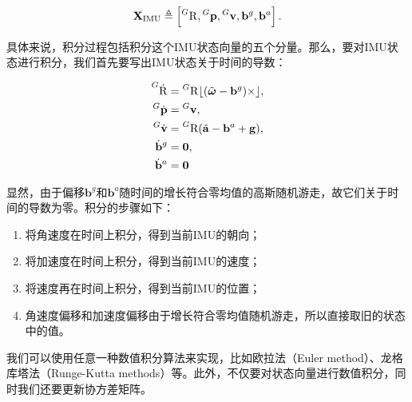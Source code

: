 \begin{equation}
  \mathbf{X}_{\textrm{IMU}} \triangleq
  \left[
      \prescript{G}{}{\mathrm R},
      \prescript{G}{}{\mathbf p},
      \prescript{G}{}{\mathbf v},
      \mathbf{b}^g, \mathbf{b}^a
  \right].
\end{equation}

具体来说，积分过程包括积分这个IMU状态向量的五个分量。那么，要对IMU状态进行积分，我们首先要写出IMU状态关于时间的导数：

\begin{equation}
\begin{aligned}
    \prescript{G}{}{\dot{\mathrm R}}
        &= \prescript{G}{}{\mathrm R} \lfloor(\tilde{\bm\omega} - \mathbf{b}^g)\times\rfloor, \\
    \prescript{G}{}{\dot{\mathbf p}}
        &= \prescript{G}{}{\mathbf v}, \\
    \prescript{G}{}{\dot{\mathbf v}}
        &= \prescript{G}{}{\mathrm R} (\tilde{\mathbf a} - \mathbf{b}^a + \mathbf{g}), \\
    \dot{\mathbf b}^g &= \mathbf{0}, \\
    \dot{\mathbf b}^a &= \mathbf{0}
\end{aligned}
\end{equation}

显然，由于偏移$\mathbf{b}^g$和$\mathbf{b}^a$随时间的增长符合零均值的高斯随机游走，故它们关于时间的导数为零。积分的步骤如下：

\begin{enumerate}
    \item 将角速度在时间上积分，得到当前IMU的朝向；
    \item 将加速度在时间上积分，得到当前IMU的速度；
    \item 将速度再在时间上积分，得到当前IMU的位置；
    \item 角速度偏移和加速度偏移由于增长符合零均值随机游走，所以直接取旧的状态中的值。
\end{enumerate}

我们可以使用任意一种数值积分算法来实现，比如欧拉法（Euler method）、龙格库塔法（Runge-Kutta methods）\citep{wiki2017runge}等。此外，不仅要对状态向量进行数值积分，同时我们还要更新协方差矩阵。
